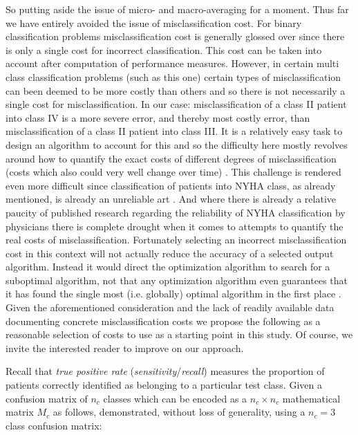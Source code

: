 \documentclass[]{article}
\begin{document}
So putting aside the issue of micro- and macro-averaging for a moment. Thus far we have entirely avoided the issue of misclassification cost. For binary classification problems misclassification cost is generally glossed over since there is only a single cost for incorrect classification. This cost can be taken into account after computation of performance measures. However, in certain multi class classification problems (such as this one) certain types of misclassification can been deemed to be more costly than others and so there is not necessarily a single cost for misclassification. In our case: misclassification of a class II patient into class IV is a more severe error, and thereby most costly error, than misclassification of a class II patient into class III. It is a relatively easy task to design an algorithm to account for this and so the difficulty here mostly revolves around how to quantify the exact costs of different degrees of misclassification (costs which also could very well change over time) \cite{Kautz2017}. This challenge is rendered even more difficult since classification of patients into NYHA class, as already mentioned, is already an unreliable art \cite{Carroll2014,Goldman1981a,Raphael2007a,Kubo2004}. And where there is already a relative paucity of published research regarding the reliability of NYHA classification by physicians there is complete drought when it comes to attempts to quantify the real costs of misclassification. Fortunately selecting an incorrect misclassification cost in this context will not actually reduce the accuracy of a selected output algorithm. Instead it would direct the optimization algorithm to search for a suboptimal algorithm, not that any optimization algorithm even guarantees that it has found the single most (i.e. globally) optimal algorithm in the first place \cite{Segaran2007}. Given the aforementioned consideration and the lack of readily available data documenting concrete misclassification costs we propose the following as a reasonable selection of costs to use as a starting point in this study. Of course, we invite the interested reader to improve on our approach.

Recall that \textit{true positive rate} (\textit{sensitivity}/\textit{recall}) measures the proportion of patients correctly identified as belonging to a particular test class. Given a confusion matrix of $n_c$ classes which can be encoded as a $n_c\times n_c$ mathematical matrix $M_c$ as follows, demonstrated, without loss of generality, using a $n_c=3$ class confusion matrix:
\end{document}
